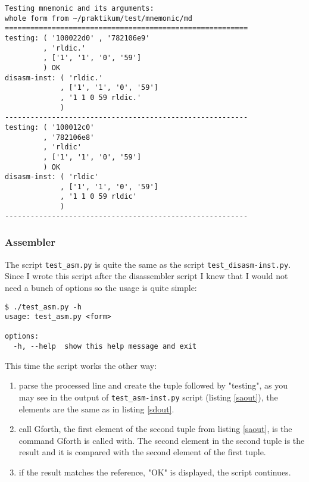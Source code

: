 \begin{lstlisting}[float, caption=Output of test-disasm-inst.py, label=sdout]
Testing mnemonic and its arguments:
whole form from ~/praktikum/test/mnemonic/md
=========================================================
testing: ( '100022d0' , '782106e9'
         , 'rldic.'
         , ['1', '1', '0', '59']
         ) OK
disasm-inst: ( 'rldic.'
             , ['1', '1', '0', '59']
             , '1 1 0 59 rldic.'
             )
---------------------------------------------------------
testing: ( '100012c0'
         , '782106e8'
         , 'rldic'
         , ['1', '1', '0', '59']
         ) OK
disasm-inst: ( 'rldic'
             , ['1', '1', '0', '59']
             , '1 1 0 59 rldic'
             )
---------------------------------------------------------
\end{lstlisting}

\subsubsection{Assembler}

The script \texttt{test\_asm.py} is quite the same as the script
\texttt{test\_disasm-inst.py}. Since I wrote this script after the disassembler
script I knew that I would not need a bunch of options so the usage is quite
simple:

\begin{verbatim}
$ ./test_asm.py -h
usage: test_asm.py <form>

options:
  -h, --help  show this help message and exit
\end{verbatim}

This time the script works the other way:

\begin{enumerate}
    \item parse the processed line and create the tuple followed by "testing",
    as you may see in the output of \texttt{test\_asm-inst.py} script
    (listing \ref{saout}), the elements are the same as in listing \ref{sdout}.
    \item call Gforth, the first element of the second tuple from listing
    \ref{saout}, is the command Gforth is called with. The second element in 
    the second tuple is the result and it is compared with the second element 
    of the first tuple.
    \item if the result matches the reference, "OK" is displayed, the script
    continues.
\end{enumerate}

